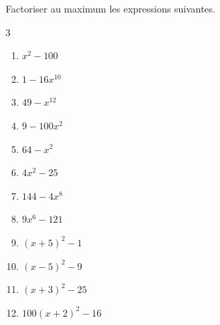 \documentclass[main.tex]{subfiles}
\begin{document}
\newpage 
\begin{exercise}\label{chapter03:exercices:factoriser03} Factoriser au maximum les expressions suivantes.
	\begin{multicols}{3} 
		\begin{enumerate}[label={$\Alph*(x)=$}, leftmargin=*] 
			\item  $x^2-100$
			\item $1-16x^10$
			\item $49-x^{12}$
			\item $9-100x^2$
			\item $64-x^2$
			\item $4x^2-25$
			\item $144-4x^8$
			\item $9x^6-121$
			\item $(x+5)^2-1$
			\item $(x-5)^2-9$
			\item $(x+3)^2-25$  
			\item $100(x+2)^2-16$  
		\end{enumerate} 
	\end{multicols}
\end{exercise}
\end{document}
